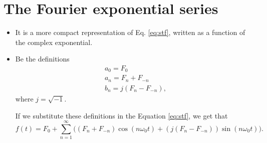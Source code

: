 \section{The Fourier exponential series}
\begin{itemize}
\item It is a more compact representation of Eq. \ref{eq:stf}, written
  as a function of the complex exponential.
\item Be the definitions
\begin{equation}
\begin{array}{l}
  a_0 = F_0\\
  a_n = F_{n}+F_{-n}\\
  b_n = j(F_{n}-F_{-n}),
\end{array}
\tag{defs\_Fes}
\label{eq:defs_sef}
\end{equation}
where $j=\sqrt{-1}$.

If we substitute these definitions in the Equation \ref{eq:stf},
we get that
\begin{displaymath}
f(t) = F_0 + \sum_{n=1}^\infty \big((F_{n}+F_{-n}) \cos(n\omega_0t) +
   (j(F_{n}-F_{-n})) \sin(n\omega_0t)\big).
\end{displaymath}
\newpage


\end{itemize}
